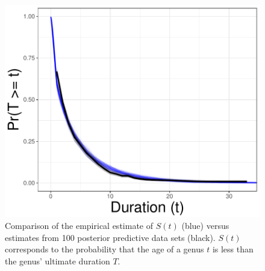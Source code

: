 \documentclass[11pt]{article}
\begin{document}
\begin{figure}[ht]
  \centering
  \includegraphics[height = 0.5\textheight,width=\textwidth,keepaspectratio=true]{figure/survival_curves_cweib_cens}
  \caption{Comparison of the empirical estimate of \(S(t)\) (blue) versus estimates from 100 posterior predictive data sets (black). \(S(t)\) corresponds to the probability that the age of a genus \(t\) is less than the genus' ultimate duration \(T\). }
  \label{fig:surv}
\end{figure}
\end{document}

